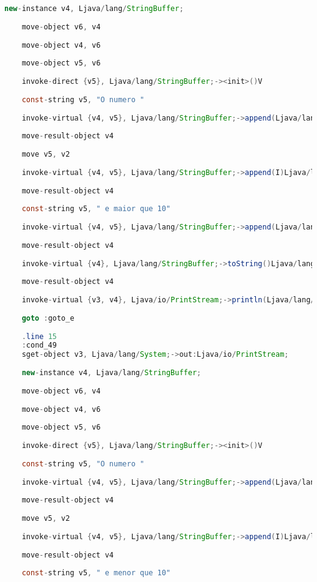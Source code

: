 \documentclass[hidelinks,12pt]{article}
\begin{document}
\begin{lstlisting}[caption=Smali resultante do .java,language=java]
	new-instance v4, Ljava/lang/StringBuffer;
	
	move-object v6, v4
	
	move-object v4, v6
	
	move-object v5, v6
	
	invoke-direct {v5}, Ljava/lang/StringBuffer;-><init>()V
	
	const-string v5, "O numero "
	
	invoke-virtual {v4, v5}, Ljava/lang/StringBuffer;->append(Ljava/lang/String;)Ljava/lang/StringBuffer;
	
	move-result-object v4
	
	move v5, v2
	
	invoke-virtual {v4, v5}, Ljava/lang/StringBuffer;->append(I)Ljava/lang/StringBuffer;
	
	move-result-object v4
	
	const-string v5, " e maior que 10"
	
	invoke-virtual {v4, v5}, Ljava/lang/StringBuffer;->append(Ljava/lang/String;)Ljava/lang/StringBuffer;
	
	move-result-object v4
	
	invoke-virtual {v4}, Ljava/lang/StringBuffer;->toString()Ljava/lang/String;
	
	move-result-object v4
	
	invoke-virtual {v3, v4}, Ljava/io/PrintStream;->println(Ljava/lang/String;)V
	
	goto :goto_e
	
	.line 15
	:cond_49
	sget-object v3, Ljava/lang/System;->out:Ljava/io/PrintStream;
	
	new-instance v4, Ljava/lang/StringBuffer;
	
	move-object v6, v4
	
	move-object v4, v6
	
	move-object v5, v6
	
	invoke-direct {v5}, Ljava/lang/StringBuffer;-><init>()V
	
	const-string v5, "O numero "
	
	invoke-virtual {v4, v5}, Ljava/lang/StringBuffer;->append(Ljava/lang/String;)Ljava/lang/StringBuffer;
	
	move-result-object v4
	
	move v5, v2
	
	invoke-virtual {v4, v5}, Ljava/lang/StringBuffer;->append(I)Ljava/lang/StringBuffer;
	
	move-result-object v4
	
	const-string v5, " e menor que 10"
	

\end{lstlisting}
\end{document}
